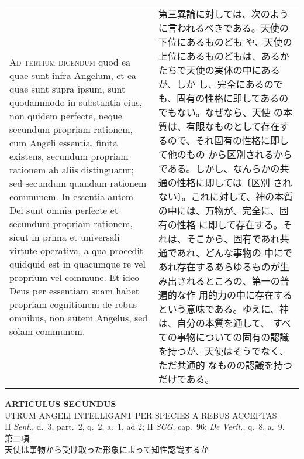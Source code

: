 \documentclass[10pt]{jsarticle} %
\begin{document}
\begin{longtable}{p{21em}p{21em}}
\\


{\scshape Ad tertium dicendum} quod ea quae sunt infra Angelum, et ea
quae sunt supra ipsum, sunt quodammodo in substantia eius, non quidem
perfecte, neque secundum propriam rationem, cum Angeli essentia, finita
existens, secundum propriam rationem ab aliis distinguatur; sed secundum
quandam rationem communem. In essentia autem Dei sunt omnia perfecte et
secundum propriam rationem, sicut in prima et universali virtute
operativa, a qua procedit quidquid est in quacumque re vel proprium vel
commune. Et ideo Deus per essentiam suam habet propriam cognitionem de
rebus omnibus, non autem Angelus, sed solam communem.


&

第三異論に対しては、次のように言われるべきである。天使の下位にあるものども
や、天使の上位にあるものどもは、あるかたちで天使の実体の中にあるが、しか
 し、完全にあるのでも、固有の性格に即してあるのでもない。なぜなら、天使
 の本質は、有限なものとして存在するので、それ固有の性格に即して他のもの
 から区別されるからである。しかし、なんらかの共通の性格に即しては〔区別
 されない〕。これに対して、神の本質の中には、万物が、完全に、固有の性格
 に即して存在する。それは、そこから、固有であれ共通であれ、どんな事物の
 中にであれ存在するあらゆるものが生み出されるところの、第一の普遍的な作
 用的力の中に存在するという意味である。ゆえに、神は、自分の本質を通して、
 すべての事物についての固有の認識を持つが、天使はそうでなく、ただ共通的
 なものの認識を持つだけである。

\end{longtable}
\newpage


\begin{center}
 {\Large {\bf ARTICULUS SECUNDUS}}\\
 {\large UTRUM ANGELI INTELLIGANT PER SPECIES A REBUS ACCEPTAS}\\
 {\footnotesize II {\itshape Sent.}, d.~3, part.~2, q.~2, a.~1, ad 2; II
 {\itshape SCG}, cap.~96; {\itshape De Verit.}, q.~8, a.~9.}\\
 {\Large 第二項\\天使は事物から受け取った形象によって知性認識するか}
\end{center}
\end{document}
